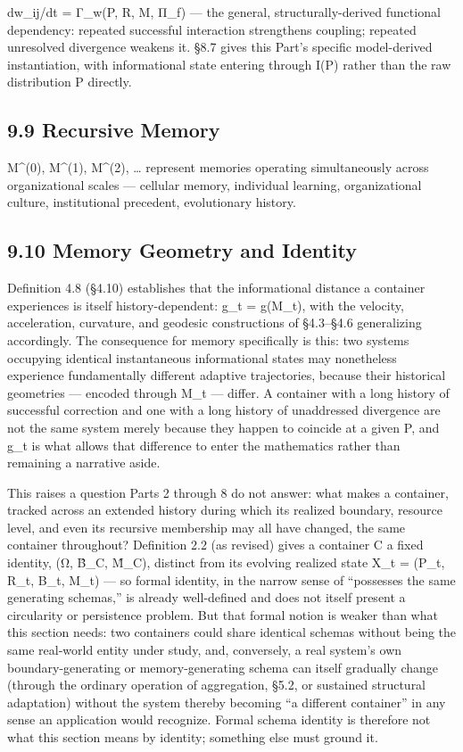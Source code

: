 \documentclass[
]{article}
\begin{document}
dw\_ij/dt = Γ\_w(P, R, M, Π\_f) --- the general, structurally-derived
functional dependency: repeated successful interaction strengthens
coupling; repeated unresolved divergence weakens it. §8.7 gives this
Part's specific model-derived instantiation, with informational state
entering through I(P) rather than the raw distribution P directly.

\hypertarget{recursive-memory}{%
\subsection{9.9 Recursive Memory}\label{recursive-memory}}

M\^{}(0), M\^{}(1), M\^{}(2), \ldots{} represent memories operating
simultaneously across organizational scales --- cellular memory,
individual learning, organizational culture, institutional precedent,
evolutionary history.

\hypertarget{memory-geometry-and-identity}{%
\subsection{9.10 Memory Geometry and
Identity}\label{memory-geometry-and-identity}}

Definition 4.8 (§4.10) establishes that the informational distance a
container experiences is itself history-dependent: g\_t = g(M\_t), with
the velocity, acceleration, curvature, and geodesic constructions of
§4.3--§4.6 generalizing accordingly. The consequence for memory
specifically is this: two systems occupying identical instantaneous
informational states may nonetheless experience fundamentally different
adaptive trajectories, because their historical geometries --- encoded
through M\_t --- differ. A container with a long history of successful
correction and one with a long history of unaddressed divergence are not
the same system merely because they happen to coincide at a given P, and
g\_t is what allows that difference to enter the mathematics rather than
remaining a narrative aside.

This raises a question Parts 2 through 8 do not answer: what makes a
container, tracked across an extended history during which its realized
boundary, resource level, and even its recursive membership may all have
changed, the same container throughout? Definition 2.2 (as revised)
gives a container C a fixed identity, (Ω, B̂\_C, M̂\_C), distinct from its
evolving realized state X\_t = (P\_t, R\_t, B\_t, M\_t) --- so formal
identity, in the narrow sense of ``possesses the same generating
schemas,'' is already well-defined and does not itself present a
circularity or persistence problem. But that formal notion is weaker
than what this section needs: two containers could share identical
schemas without being the same real-world entity under study, and,
conversely, a real system's own boundary-generating or memory-generating
schema can itself gradually change (through the ordinary operation of
aggregation, §5.2, or sustained structural adaptation) without the
system thereby becoming ``a different container'' in any sense an
application would recognize. Formal schema identity is therefore not
what this section means by identity; something else must ground it.
\end{document}

